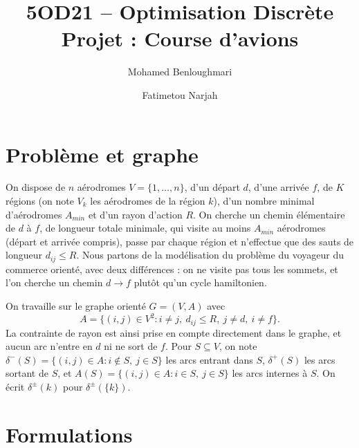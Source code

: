 \documentclass[11pt]{article}
\title{5OD21 -- Optimisation Discrète\\Projet : Course d'avions}
\author{Mohamed Benloughmari \and Fatimetou Narjah}
\date{}
\begin{document}
\maketitle
\vspace{-1.3cm}

\section{Problème et graphe}

On dispose de $n$ aérodromes $V=\{1,\dots,n\}$, d'un départ $d$, d'une arrivée $f$, de
$K$ régions (on note $V_k$ les aérodromes de la région $k$), d'un nombre minimal
d'aérodromes $A_{min}$ et d'un rayon d'action $R$. On cherche un chemin élémentaire de
$d$ à $f$, de longueur totale minimale, qui visite au moins $A_{min}$ aérodromes
(départ et arrivée compris), passe par chaque région et n'effectue que des sauts de
longueur $d_{ij}\le R$. Nous partons de la modélisation du problème du voyageur du
commerce orienté, avec deux différences : on ne
visite pas tous les sommets, et l'on cherche un chemin $d\to f$ plutôt qu'un cycle
hamiltonien.

On travaille sur le graphe orienté $G=(V,A)$ avec
\[
A=\{(i,j)\in V^2 : i\neq j,\ d_{ij}\le R,\ j\neq d,\ i\neq f\}.
\]
La contrainte de rayon est ainsi prise en compte directement dans le graphe, et aucun arc
n'entre en $d$ ni ne sort de $f$. Pour $S\subseteq V$, on note
$\delta^-(S)=\{(i,j)\in A : i\notin S,\ j\in S\}$ les arcs entrant dans $S$,
$\delta^+(S)$ les arcs sortant de $S$, et $A(S)=\{(i,j)\in A : i\in S,\ j\in S\}$ les arcs
internes à $S$. On écrit $\delta^\pm(k)$
pour $\delta^\pm(\{k\})$.

\section{Formulations}
\end{document}
